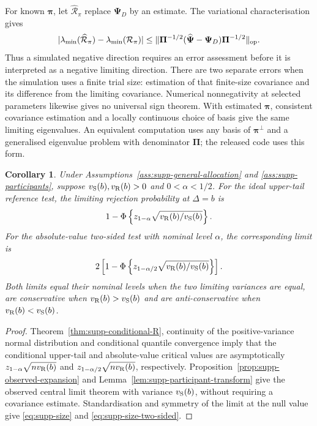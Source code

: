 \documentclass[12pt,a4paper]{article}
\newtheorem{corollary}{Corollary}
\theoremstyle{definition}
\theoremstyle{remark}\newtheorem{remark}{Remark}
\numberwithin{equation}{section}
\begin{document}
For known $\bm\pi$, let $\widehat{\mathcal R}_\pi$ replace $\bm\Psi_D$ by an estimate. The variational characterisation gives
\[
 |\lambda_{\min}(\widehat{\mathcal R}_\pi)-\lambda_{\min}(\mathcal R_\pi)|
 \le\|\bm\Pi^{-1/2}(\widehat{\bm\Psi}-\bm\Psi_D)\bm\Pi^{-1/2}\|_{\rm op}.
\]
Thus a simulated negative direction requires an error assessment before it is interpreted as a negative limiting direction. There are two separate errors when the simulation uses a finite trial size: estimation of that finite-size covariance and its difference from the limiting covariance. Numerical nonnegativity at selected parameters likewise gives no universal sign theorem. With estimated $\bm\pi$, consistent covariance estimation and a locally continuous choice of basis give the same limiting eigenvalues. An equivalent computation uses any basis of $\bm\pi^\perp$ and a generalised eigenvalue problem with denominator $\bm\Pi$; the released code uses this form.

\begin{corollary}\label{cor:supp-size}
Under Assumptions~\ref{ass:supp-general-allocation} and \ref{ass:supp-participants}, suppose $v_{\rm S}(b),v_{\rm R}(b)>0$ and $0<\alpha<1/2$. For the ideal upper-tail reference test, the limiting rejection probability at $\Delta=b$ is
\begin{equation}\label{eq:supp-size}
1-\Phi\left\{z_{1-\alpha}\sqrt{v_{\rm R}(b)/v_{\rm S}(b)}\right\}.
\end{equation}
For the absolute-value two-sided test with nominal level $\alpha$, the corresponding limit is
\begin{equation}\label{eq:supp-size-two-sided}
2\left[1-\Phi\left\{z_{1-\alpha/2}\sqrt{v_{\rm R}(b)/v_{\rm S}(b)}\right\}\right].
\end{equation}
Both limits equal their nominal levels when the two limiting variances are equal, are conservative when $v_{\rm R}(b)>v_{\rm S}(b)$ and are anti-conservative when $v_{\rm R}(b)<v_{\rm S}(b)$.
\end{corollary}

\begin{proof}
Theorem~\ref{thm:supp-conditional-R}, continuity of the positive-variance normal distribution and conditional quantile convergence imply that the conditional upper-tail and absolute-value critical values are asymptotically $z_{1-\alpha}\sqrt{n v_{\rm R}(b)}$ and $z_{1-\alpha/2}\sqrt{n v_{\rm R}(b)}$, respectively. Proposition~\ref{prop:supp-observed-expansion} and Lemma~\ref{lem:supp-participant-transform} give the observed central limit theorem with variance $v_{\rm S}(b)$, without requiring a covariance estimate. Standardisation and symmetry of the limit at the null value give \eqref{eq:supp-size} and \eqref{eq:supp-size-two-sided}.
\end{proof}
\end{document}
